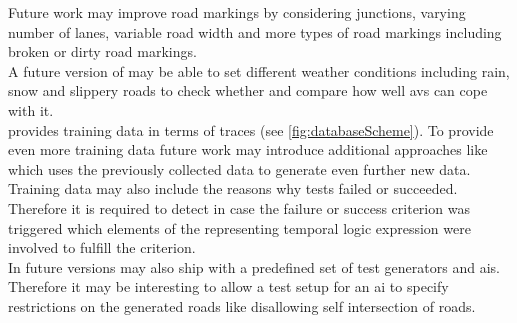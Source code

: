 Future work may improve road markings by considering junctions, varying number of lanes, variable road width and more types of road markings including broken or dirty road markings.\\
A future version of \drivebuild{} may be able to set different weather conditions including rain, snow and slippery roads to check whether and compare how well \glspl{av} can cope with it.\\
\drivebuild{} provides training data in terms of traces (see \cref{fig:databaseScheme}).
To provide even more training data future work may introduce additional approaches like \scenic{} which uses the previously collected data to generate even further new data.
Training data may also include the reasons why tests failed or succeeded.
Therefore it is required to detect in case the failure or success criterion was triggered which elements of the representing temporal logic expression were involved to fulfill the criterion.\\
In future versions \drivebuild{} may also ship with a predefined set of test generators and \glspl{ai}.
Therefore it may be interesting to allow a test setup for an \gls{ai} to specify restrictions on the generated roads like disallowing self intersection of roads.
